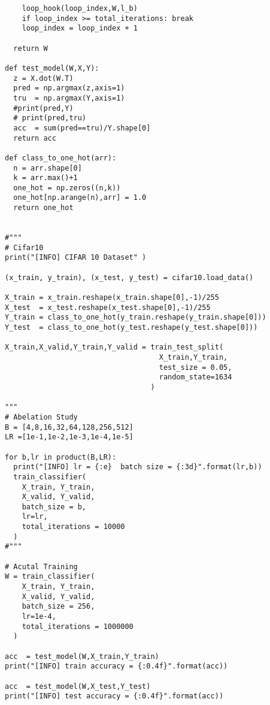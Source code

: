 \documentclass[10pt]{article}
\begin{document}
\begin{verbatim}
    loop_hook(loop_index,W,l_b)
    if loop_index >= total_iterations: break
    loop_index = loop_index + 1

  return W

def test_model(W,X,Y):
  z = X.dot(W.T)
  pred = np.argmax(z,axis=1) 
  tru  = np.argmax(Y,axis=1)
  #print(pred,Y)
  # print(pred,tru)
  acc  = sum(pred==tru)/Y.shape[0]
  return acc

def class_to_one_hot(arr):
  n = arr.shape[0]
  k = arr.max()+1
  one_hot = np.zeros((n,k))
  one_hot[np.arange(n),arr] = 1.0
  return one_hot


#"""
# Cifar10
print("[INFO] CIFAR 10 Dataset" )

(x_train, y_train), (x_test, y_test) = cifar10.load_data()

X_train = x_train.reshape(x_train.shape[0],-1)/255
X_test  = x_test.reshape(x_test.shape[0],-1)/255
Y_train = class_to_one_hot(y_train.reshape(y_train.shape[0]))
Y_test  = class_to_one_hot(y_test.reshape(y_test.shape[0]))

X_train,X_valid,Y_train,Y_valid = train_test_split(
                                    X_train,Y_train,
                                    test_size = 0.05,
                                    random_state=1634
                                  )

"""
# Abelation Study
B = [4,8,16,32,64,128,256,512]
LR =[1e-1,1e-2,1e-3,1e-4,1e-5]

for b,lr in product(B,LR):
  print("[INFO] lr = {:e}  batch size = {:3d}".format(lr,b))
  train_classifier(
    X_train, Y_train,
    X_valid, Y_valid, 
    batch_size = b, 
    lr=lr, 
    total_iterations = 10000
  )
#"""

# Acutal Training
W = train_classifier(
    X_train, Y_train,
    X_valid, Y_valid, 
    batch_size = 256, 
    lr=1e-4, 
    total_iterations = 1000000
  )

acc  = test_model(W,X_train,Y_train)
print("[INFO] train accuracy = {:0.4f}".format(acc))

acc  = test_model(W,X_test,Y_test)
print("[INFO] test accuracy = {:0.4f}".format(acc))
\end{verbatim}
\end{document}
